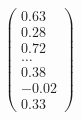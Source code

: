 \documentclass[preview]{standalone}
\begin{document}
\begin{align*}
\begin{pmatrix} 0.63 \\ 0.28 \\ 0.72 \\ \dots \\ 0.38 \\ -0.02 \\ 0.33 \end{pmatrix}
\end{align*}
\end{document}
